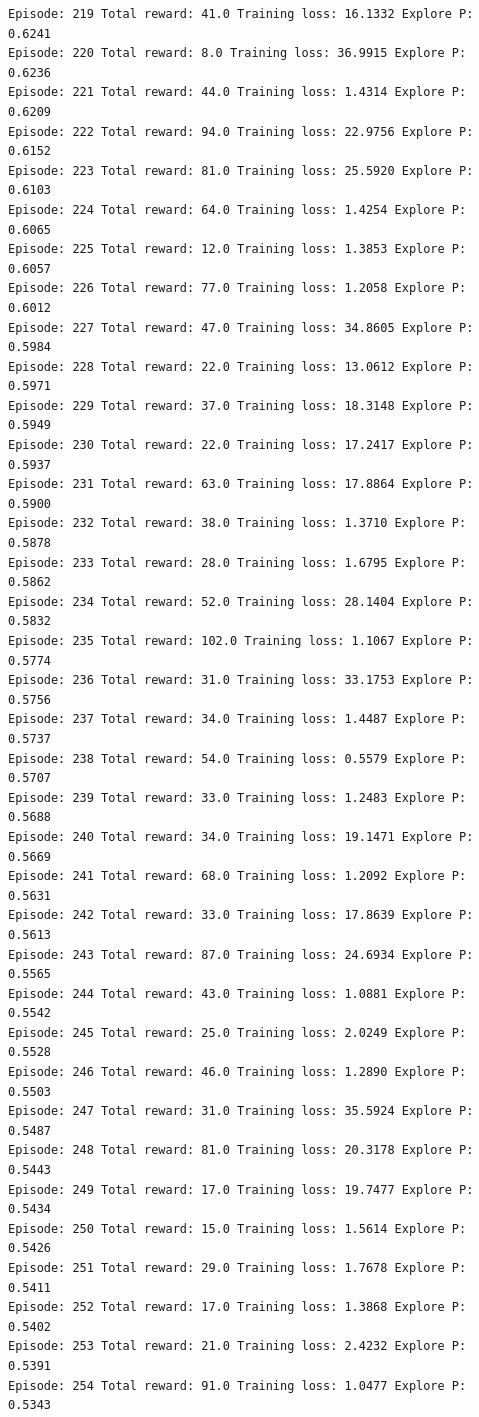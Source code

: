 \documentclass[11pt]{article}
\begin{document}
\begin{Verbatim}[commandchars=\\\{\}]
Episode: 219 Total reward: 41.0 Training loss: 16.1332 Explore P: 0.6241
Episode: 220 Total reward: 8.0 Training loss: 36.9915 Explore P: 0.6236
Episode: 221 Total reward: 44.0 Training loss: 1.4314 Explore P: 0.6209
Episode: 222 Total reward: 94.0 Training loss: 22.9756 Explore P: 0.6152
Episode: 223 Total reward: 81.0 Training loss: 25.5920 Explore P: 0.6103
Episode: 224 Total reward: 64.0 Training loss: 1.4254 Explore P: 0.6065
Episode: 225 Total reward: 12.0 Training loss: 1.3853 Explore P: 0.6057
Episode: 226 Total reward: 77.0 Training loss: 1.2058 Explore P: 0.6012
Episode: 227 Total reward: 47.0 Training loss: 34.8605 Explore P: 0.5984
Episode: 228 Total reward: 22.0 Training loss: 13.0612 Explore P: 0.5971
Episode: 229 Total reward: 37.0 Training loss: 18.3148 Explore P: 0.5949
Episode: 230 Total reward: 22.0 Training loss: 17.2417 Explore P: 0.5937
Episode: 231 Total reward: 63.0 Training loss: 17.8864 Explore P: 0.5900
Episode: 232 Total reward: 38.0 Training loss: 1.3710 Explore P: 0.5878
Episode: 233 Total reward: 28.0 Training loss: 1.6795 Explore P: 0.5862
Episode: 234 Total reward: 52.0 Training loss: 28.1404 Explore P: 0.5832
Episode: 235 Total reward: 102.0 Training loss: 1.1067 Explore P: 0.5774
Episode: 236 Total reward: 31.0 Training loss: 33.1753 Explore P: 0.5756
Episode: 237 Total reward: 34.0 Training loss: 1.4487 Explore P: 0.5737
Episode: 238 Total reward: 54.0 Training loss: 0.5579 Explore P: 0.5707
Episode: 239 Total reward: 33.0 Training loss: 1.2483 Explore P: 0.5688
Episode: 240 Total reward: 34.0 Training loss: 19.1471 Explore P: 0.5669
Episode: 241 Total reward: 68.0 Training loss: 1.2092 Explore P: 0.5631
Episode: 242 Total reward: 33.0 Training loss: 17.8639 Explore P: 0.5613
Episode: 243 Total reward: 87.0 Training loss: 24.6934 Explore P: 0.5565
Episode: 244 Total reward: 43.0 Training loss: 1.0881 Explore P: 0.5542
Episode: 245 Total reward: 25.0 Training loss: 2.0249 Explore P: 0.5528
Episode: 246 Total reward: 46.0 Training loss: 1.2890 Explore P: 0.5503
Episode: 247 Total reward: 31.0 Training loss: 35.5924 Explore P: 0.5487
Episode: 248 Total reward: 81.0 Training loss: 20.3178 Explore P: 0.5443
Episode: 249 Total reward: 17.0 Training loss: 19.7477 Explore P: 0.5434
Episode: 250 Total reward: 15.0 Training loss: 1.5614 Explore P: 0.5426
Episode: 251 Total reward: 29.0 Training loss: 1.7678 Explore P: 0.5411
Episode: 252 Total reward: 17.0 Training loss: 1.3868 Explore P: 0.5402
Episode: 253 Total reward: 21.0 Training loss: 2.4232 Explore P: 0.5391
Episode: 254 Total reward: 91.0 Training loss: 1.0477 Explore P: 0.5343

\end{Verbatim}
\end{document}
